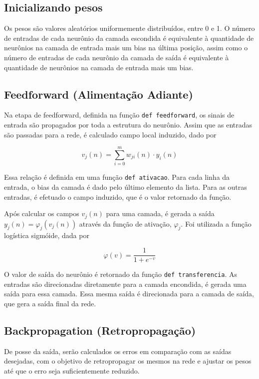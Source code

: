 \documentclass[12pt,a4paper]{article}
\begin{document}
\subsection{Inicializando pesos}

\qquad Os pesos são valores aleatórios uniformemente distribuídos, entre 0 e 1. O número de entradas de cada neurônio da camada escondida é equivalente à quantidade de neurônios na camada de entrada mais um bias na última posição, assim como o número de entradas de cada neurônio da camada de saída é equivalente à quantidade de neurônios na camada de entrada mais um bias.\\

\subsection{Feedforward (Alimentação Adiante)}

\qquad Na etapa de feedforward, definida na função \verb|def feedforward|, os sinais de entrada são propagados por toda a estrutura do neurônio. Assim que as entradas são passadas para a rede, é calculado campo local induzido, dado por 

$$v_j(n) = \sum_{i=0}^{m}w_{ji}(n)\cdot y_i(n)$$

\qquad Essa relação é definida em uma função \verb|def ativacao|. Para cada linha da entrada, o bias da camada é dado pelo último elemento da lista. Para as outras entradas, é efetuado o campo induzido, que é o valor retornado da função.

\qquad Após calcular os campos $v_j(n)$ para uma camada, é gerada a saída $y_j(n) = \varphi_j(v_j(n))$ através da função de ativação, $\varphi_j$. Foi utilizada a função logística sigmóide, dada por

$$ \varphi(v) = \dfrac{1}{1+e^{-v}}$$

O valor de saída do neurônio é retornado da função \verb|def transferencia|. As entradas são direcionadas diretamente para a camada encondida, é gerada uma saída para essa camada. Essa mesma saída é direcionada para a camada de saída, que gera a saída final da rede.\\

\subsection{Backpropagation (Retropropagação)}

\qquad De posse da saída, serão calculados os erros em comparação com as saídas desejadas, com o objetivo de retropropagar os mesmos na rede e ajustar os pesos até que o erro seja suficientemente reduzido.
\end{document}
